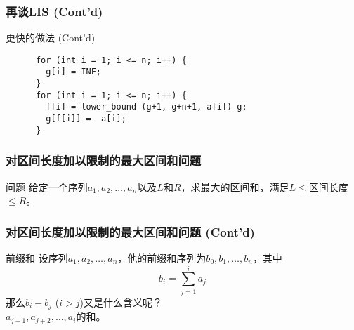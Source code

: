 \documentclass[hyperref={unicode=true}]{beamer}
\theoremstyle{definition}
\theoremstyle{proof}
\begin{document}
\begin{frame}[fragile]\frametitle{再谈LIS (Cont'd)}
  \begin{exampleblock}{更快的做法 (Cont'd)}
    \begin{verbatim}
      for (int i = 1; i <= n; i++) {
        g[i] = INF;
      }
      for (int i = 1; i <= n; i++) {
        f[i] = lower_bound (g+1, g+n+1, a[i])-g;
        g[f[i]] =  a[i];
      }
    \end{verbatim}
  \end{exampleblock}
\end{frame}

\begin{frame}\frametitle{对区间长度加以限制的最大区间和问题}
  \begin{block}{问题}
    给定一个序列$a_1,a_2,\ldots,a_n$以及$L$和$R$，求最大的区间和，满足$L\leq$区间长度$\leq R$。
  \end{block}
\end{frame}

\begin{frame}\frametitle{对区间长度加以限制的最大区间和问题 (Cont'd)}
  \begin{alertblock}{前缀和}
    设序列$a_1,a_2,\ldots,a_n$，他的前缀和序列为$b_0,b_1,\ldots,b_n$，其中
    \[b_i=\sum_{j=1}^i a_j\]
    那么$b_i-b_j$ ($i>j$)又是什么含义呢？\\
    \pause{}$a_{j+1},a_{j+2},\ldots,a_i$的和。
  \end{alertblock}
\end{frame}
\end{document}
